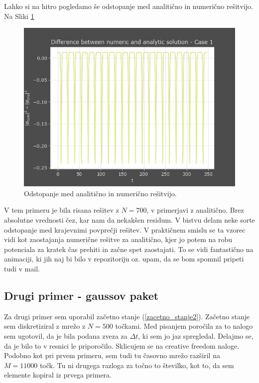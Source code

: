 \documentclass[a4paper]{article}
\begin{document}
Lahko si na hitro pogledamo še odstopanje med analitično in numerično rešitvijo. Na Sliki \ref{fig:harmonic_oscillator_error}

\begin{figure}[p]
    \centering
    \includegraphics[width=\textwidth]{./images/delta_numeric_analytic_N700.png}
    \caption{Odstopanje med analitično in numerično rešitvijo.}
    \label{fig:harmonic_oscillator_error}
\end{figure}

V tem primeru je bila risana rešitev z $N=700$, v primerjavi z analitično. Brez absolutne vrednosti
čez, kar nam da nekakšen residum. V bistvu delam neke sorte odstopanje med krajevnimi povprečji rešitev. 
V praktičnem smislu se ta vzorec vidi kot zaostajanja numerične rešitve za analitično, kjer jo potem na 
robu potenciala za kratek čas prehiti in začne spet zaostajati. To se vidi fantastično na animaciji, ki jih
naj bi bilo v repozitoriju oz. upam, da se bom spomnil pripeti tudi v mail. \\

\subsection{Drugi primer - gaussov paket}
Za drugi primer sem uporabil začetno stanje (\ref{zacetno_stanje2}).
Začetno stanje sem diskretiziral z mrežo z $N=500$ točkami. Med pisanjem poročila za to nalogo
sem ugotovil, da je bila podana zveza za $\Delta t$, ki sem jo jaz spregledal. Delajmo se, da je bilo to
v resnici le priporočilo. Sklicujem se na creative freedom naloge. Podobno kot pri prvem primeru, sem tudi
tu časovno mrežo razširil na $M=11000$ točk. Tu ni drugega razloga za točno to številko, kot to, da sem 
elemente kopiral iz prvega primera. \\
\end{document}
